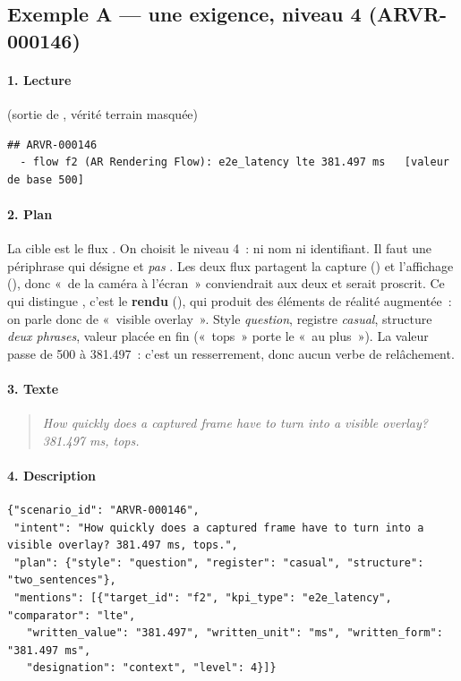 \documentclass[11pt,a4paper]{article}
\newcommand{\code}[1]{\texttt{\detokenize{#1}}}
\begin{document}
\subsection{Exemple A --- une exigence, niveau 4 (ARVR-000146)}

\paragraph{1. Lecture} (sortie de \code{view}, vérité terrain masquée)
\begin{lstlisting}
## ARVR-000146
  - flow f2 (AR Rendering Flow): e2e_latency lte 381.497 ms   [valeur de base 500]
\end{lstlisting}

\paragraph{2. Plan}
La cible est le flux \code{f2}. On choisit le niveau 4~: ni nom ni identifiant. Il faut une périphrase qui désigne \code{f2} et \emph{pas} \code{f1}. Les deux flux partagent la capture (\code{C1}) et l'affichage (\code{C5}), donc «~de la caméra à l'écran~» conviendrait aux deux et serait proscrit. Ce qui distingue \code{f2}, c'est le \textbf{rendu} (\code{C4}), qui produit des éléments de réalité augmentée~: on parle donc de «~visible overlay~». Style \emph{question}, registre \emph{casual}, structure \emph{deux phrases}, valeur placée en fin («~tops~» porte le «~au plus~»). La valeur passe de 500 à 381.497~: c'est un resserrement, donc aucun verbe de relâchement.

\paragraph{3. Texte}
\begin{quote}
\foreignlanguage{english}{\emph{How quickly does a captured frame have to turn into a visible overlay? 381.497 ms, tops.}}
\end{quote}

\paragraph{4. Description}
\begin{lstlisting}
{"scenario_id": "ARVR-000146",
 "intent": "How quickly does a captured frame have to turn into a visible overlay? 381.497 ms, tops.",
 "plan": {"style": "question", "register": "casual", "structure": "two_sentences"},
 "mentions": [{"target_id": "f2", "kpi_type": "e2e_latency", "comparator": "lte",
   "written_value": "381.497", "written_unit": "ms", "written_form": "381.497 ms",
   "designation": "context", "level": 4}]}
\end{lstlisting}
\end{document}
